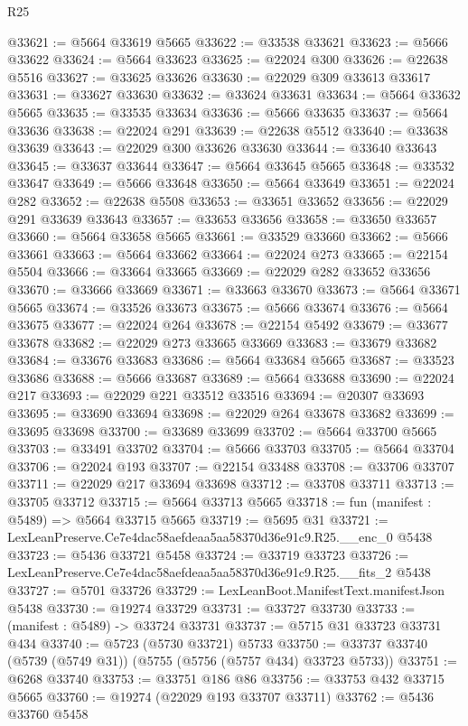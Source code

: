 \begin{lexlean}{R25}
\begin{coremodule}
@33621 := @5664 @33619 @5665
@33622 := @33538 @33621
@33623 := @5666 @33622
@33624 := @5664 @33623
@33625 := @22024 @300
@33626 := @22638 @5516
@33627 := @33625 @33626
@33630 := @22029 @309 @33613 @33617
@33631 := @33627 @33630
@33632 := @33624 @33631
@33634 := @5664 @33632 @5665
@33635 := @33535 @33634
@33636 := @5666 @33635
@33637 := @5664 @33636
@33638 := @22024 @291
@33639 := @22638 @5512
@33640 := @33638 @33639
@33643 := @22029 @300 @33626 @33630
@33644 := @33640 @33643
@33645 := @33637 @33644
@33647 := @5664 @33645 @5665
@33648 := @33532 @33647
@33649 := @5666 @33648
@33650 := @5664 @33649
@33651 := @22024 @282
@33652 := @22638 @5508
@33653 := @33651 @33652
@33656 := @22029 @291 @33639 @33643
@33657 := @33653 @33656
@33658 := @33650 @33657
@33660 := @5664 @33658 @5665
@33661 := @33529 @33660
@33662 := @5666 @33661
@33663 := @5664 @33662
@33664 := @22024 @273
@33665 := @22154 @5504
@33666 := @33664 @33665
@33669 := @22029 @282 @33652 @33656
@33670 := @33666 @33669
@33671 := @33663 @33670
@33673 := @5664 @33671 @5665
@33674 := @33526 @33673
@33675 := @5666 @33674
@33676 := @5664 @33675
@33677 := @22024 @264
@33678 := @22154 @5492
@33679 := @33677 @33678
@33682 := @22029 @273 @33665 @33669
@33683 := @33679 @33682
@33684 := @33676 @33683
@33686 := @5664 @33684 @5665
@33687 := @33523 @33686
@33688 := @5666 @33687
@33689 := @5664 @33688
@33690 := @22024 @217
@33693 := @22029 @221 @33512 @33516
@33694 := @20307 @33693
@33695 := @33690 @33694
@33698 := @22029 @264 @33678 @33682
@33699 := @33695 @33698
@33700 := @33689 @33699
@33702 := @5664 @33700 @5665
@33703 := @33491 @33702
@33704 := @5666 @33703
@33705 := @5664 @33704
@33706 := @22024 @193
@33707 := @22154 @33488
@33708 := @33706 @33707
@33711 := @22029 @217 @33694 @33698
@33712 := @33708 @33711
@33713 := @33705 @33712
@33715 := @5664 @33713 @5665
@33718 := fun (manifest : @5489) => @5664 @33715 @5665
@33719 := @5695 @31
@33721 := LexLeanPreserve.Ce7e4dac58aefdeaa5aa58370d36e91c9.R25.__enc_0 @5438
@33723 := @5436 @33721 @5458
@33724 := @33719 @33723
@33726 := LexLeanPreserve.Ce7e4dac58aefdeaa5aa58370d36e91c9.R25.__fits_2 @5438
@33727 := @5701 @33726
@33729 := LexLeanBoot.ManifestText.manifestJson @5438
@33730 := @19274 @33729
@33731 := @33727 @33730
@33733 := (manifest : @5489) -> @33724 @33731
@33737 := @5715 @31 @33723 @33731 @434
@33740 := @5723 (@5730 @33721) @5733
@33750 := @33737 @33740 (@5739 (@5749 @31)) (@5755 (@5756 (@5757 @434) @33723 @5733))
@33751 := @6268 @33740
@33753 := @33751 @186 @86
@33756 := @33753 @432 @33715 @5665
@33760 := @19274 (@22029 @193 @33707 @33711)
@33762 := @5436 @33760 @5458

\end{coremodule}
\end{lexlean}
